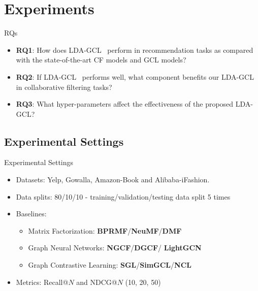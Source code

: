 \documentclass[t]{beamer}
\begin{document}
\section{Experiments}
\begin{frame}[c]{RQs}
\begin{itemize}
    \item \textbf{RQ1}: How does LDA-GCL~ perform in recommendation tasks as compared with the state-of-the-art CF models and GCL models?
    \item \textbf{RQ2}: If LDA-GCL~ performs well, what component benefits our LDA-GCL~ in collaborative filtering tasks?     
    \item \textbf{RQ3}: What hyper-parameters affect the effectiveness of the proposed LDA-GCL? 
\end{itemize}
\end{frame}

\subsection{Experimental Settings}

\begin{frame}{Experimental Settings}

\begin{table}[H]
\centering
\caption{Statistics of the datasets used in this paper.}
\label{tb:dataset}
\end{table}

\begin{itemize}
    \item Datasets: Yelp, Gowalla, Amazon-Book and Alibaba-iFashion.
    \item Data splits: 80/10/10 - training/validation/testing data split 5 times
    \item Baselines: 
    \begin{itemize}
        \item Matrix Factorization: \textbf{BPRMF}/\textbf{NeuMF}/\textbf{DMF}
        \item Graph Neural Networks: \textbf{NGCF}/\textbf{DGCF}/ \textbf{LightGCN}
        \item Graph Contrastive Learning: \textbf{SGL}/\textbf{SimGCL}/\textbf{NCL}
    \end{itemize}
    \item Metrics: Recall@$N$ and NDCG@$N$ (10, 20, 50)
\end{itemize}
\end{frame}
\end{document}
